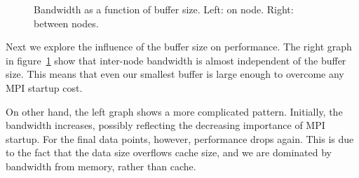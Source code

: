 \begin{figure}
  \pgfplotsset{width=3.5in,compat=1.7}
  \hbox\bgroup %

  \egroup %
  \caption{Bandwidth as a function of buffer size. Left: on node. Right: between nodes.}
  \label{fig:hbw-interintra-b}
\end{figure}

Next we explore the influence of the buffer size on performance.
The right graph in figure~\ref{fig:hbw-interintra-b}
show that inter-node bandwidth is almost independent of the buffer size.
This means that even our smallest buffer is large enough to overcome
any MPI startup cost.

On other hand, the left graph shows a more complicated pattern.
Initially, the bandwidth increases, possibly reflecting
the decreasing importance of MPI startup.
For the final data points, however, performance drops again.
This is due to the fact that the data size overflows
cache size, and we are dominated by bandwidth from memory, rather than cache.


